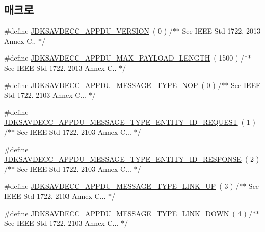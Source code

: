 \subsection*{매크로}
\begin{DoxyCompactItemize}
\item 
\#define \hyperlink{group__appdu__constants_ga56dc385655e74f514e98341140261880}{J\+D\+K\+S\+A\+V\+D\+E\+C\+C\+\_\+\+A\+P\+P\+D\+U\+\_\+\+V\+E\+R\+S\+I\+ON}~( 0 )                         /$\ast$$\ast$ See I\+E\+EE Std 1722.-\/2013 Annex C.. $\ast$/
\item 
\#define \hyperlink{group__appdu__constants_gad8ac9f39ba96a6faf9e4d69b1530272f}{J\+D\+K\+S\+A\+V\+D\+E\+C\+C\+\_\+\+A\+P\+P\+D\+U\+\_\+\+M\+A\+X\+\_\+\+P\+A\+Y\+L\+O\+A\+D\+\_\+\+L\+E\+N\+G\+TH}~( 1500 )           /$\ast$$\ast$ See I\+E\+EE Std 1722.-\/2013 Annex C.. $\ast$/
\item 
\#define \hyperlink{group__appdu__constants_ga5046c58fc443b2e4ceff64635aa0ba8c}{J\+D\+K\+S\+A\+V\+D\+E\+C\+C\+\_\+\+A\+P\+P\+D\+U\+\_\+\+M\+E\+S\+S\+A\+G\+E\+\_\+\+T\+Y\+P\+E\+\_\+\+N\+OP}~( 0 )                /$\ast$$\ast$ See I\+E\+EE Std 1722.-\/2103 Annex C... $\ast$/
\item 
\#define \hyperlink{group__appdu__constants_ga40c5d416d1df11d372c6695142d7c051}{J\+D\+K\+S\+A\+V\+D\+E\+C\+C\+\_\+\+A\+P\+P\+D\+U\+\_\+\+M\+E\+S\+S\+A\+G\+E\+\_\+\+T\+Y\+P\+E\+\_\+\+E\+N\+T\+I\+T\+Y\+\_\+\+I\+D\+\_\+\+R\+E\+Q\+U\+E\+ST}~( 1 )  /$\ast$$\ast$ See I\+E\+EE Std 1722.-\/2103 Annex C... $\ast$/
\item 
\#define \hyperlink{group__appdu__constants_ga81d2ca33e293bd267fbaf74406a45c5b}{J\+D\+K\+S\+A\+V\+D\+E\+C\+C\+\_\+\+A\+P\+P\+D\+U\+\_\+\+M\+E\+S\+S\+A\+G\+E\+\_\+\+T\+Y\+P\+E\+\_\+\+E\+N\+T\+I\+T\+Y\+\_\+\+I\+D\+\_\+\+R\+E\+S\+P\+O\+N\+SE}~( 2 ) /$\ast$$\ast$ See I\+E\+EE Std 1722.-\/2103 Annex C... $\ast$/
\item 
\#define \hyperlink{group__appdu__constants_gadae986916259f4936988bc0558770831}{J\+D\+K\+S\+A\+V\+D\+E\+C\+C\+\_\+\+A\+P\+P\+D\+U\+\_\+\+M\+E\+S\+S\+A\+G\+E\+\_\+\+T\+Y\+P\+E\+\_\+\+L\+I\+N\+K\+\_\+\+UP}~( 3 )            /$\ast$$\ast$ See I\+E\+EE Std 1722.-\/2103 Annex C... $\ast$/
\item 
\#define \hyperlink{group__appdu__constants_ga8bf2da1e0f552a7ee69e8c75083e1615}{J\+D\+K\+S\+A\+V\+D\+E\+C\+C\+\_\+\+A\+P\+P\+D\+U\+\_\+\+M\+E\+S\+S\+A\+G\+E\+\_\+\+T\+Y\+P\+E\+\_\+\+L\+I\+N\+K\+\_\+\+D\+O\+WN}~( 4 )          /$\ast$$\ast$ See I\+E\+EE Std 1722.-\/2103 Annex C... $\ast$/
$$
\end{DoxyCompactItemize}
